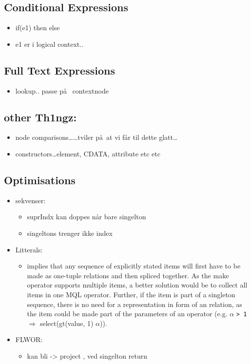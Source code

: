 \subsection{Conditional Expressions}
\label{sect:trans:TD:ifThenElse}
\begin{itemize}
  \item if(e1) then else
  \item e1 er i logical context..
\end{itemize}

\subsection{Full Text Expressions}
\label{sect:trans:TD:fulltext}
\begin{itemize}
  \item lookup.. passe p\aa~ contextnode
\end{itemize}

\subsection{other Th1ngz:}
\begin{itemize}
  \item node comparisons\ldots\ldots tviler p\aa~at vi f\aa r til dette glatt\ldots
  \item constructors\ldots element, CDATA, attribute etc etc
\end{itemize}


\subsection{Optimisations}
\label{sect:trans:TD:optimisations}
\begin{itemize}
  \item sekvenser:
	  \begin{itemize}
	    \item suprIndx kan doppes n\aa r bare singelton
	    \item singeltons trenger ikke index
      \end{itemize} 
  \item Litterals: 
		\begin{itemize}
          \item implies that any sequence of
				explicitly stated items will first have to be made as one-tuple relations and
				then spliced together. As the \textsf{make} operator supports multiple items, a
					better solution would be to collect all items in one MQL operator. Further, if
					the item is part of a singleton sequence, there is no need for a representation
					in form of an relation, as the item could be made part of the parameters of an
					operator (e.g. $\alpha$ \texttt{> 1} $\Longrightarrow$
					\textsf{select(gt(value, 1) $\alpha$)}).   
        \end{itemize}
  \item FLWOR:
  	\begin{itemize}
        \item  kan bli -> project , ved singelton return
      \end{itemize}         
\end{itemize}